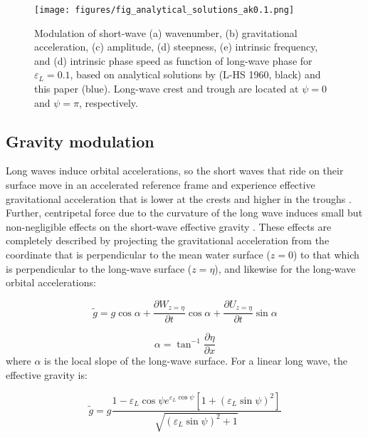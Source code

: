 \documentclass[lineno]{jfm}
\begin{document}
\begin{figure}
\centering
\texttt{[image: figures/fig\_analytical\_solutions\_ak0.1.png]}
\caption{
  Modulation of short-wave (a) wavenumber, (b) gravitational acceleration,
  (c) amplitude, (d) steepness, (e) intrinsic frequency, and (d) intrinsic phase
  speed as function of long-wave phase for $\varepsilon_L = 0.1$, based on
  analytical solutions by \citet{longuet1960changes} (L-HS 1960, black)
  and this paper (blue).
  Long-wave crest and trough are located at $\psi = 0$ and $\psi = \pi$,
  respectively.
}
\label{fig:analytical_solutions_ak0.1}
\end{figure}

\subsection{Gravity modulation}
\label{subsection:gravity_modulation}

Long waves induce orbital accelerations, so the short waves that ride on their
surface move in an accelerated reference frame and experience effective
gravitational acceleration that is lower at the crests and higher in the troughs
\citep{longuet1986eulerian,longuet1987propagation}.
Further, centripetal force due to the curvature of the long wave induces small
but non-negligible effects on the short-wave effective gravity
\citep{phillips1981dispersion,zhang1990evolution}.
These effects are completely described by projecting the gravitational
acceleration from the coordinate that is perpendicular to the mean water surface
($z=0$) to that which is perpendicular to the long-wave surface ($z=\eta$),
and likewise for the long-wave orbital accelerations:

\begin{equation}
\label{eq:gravity_modulation_general}
\widetilde{g}
  = g \cos{\alpha} 
  + \dfrac{\partial W_{z=\eta}}{\partial t} \cos{\alpha}
  + \dfrac{\partial U_{z=\eta}}{\partial t} \sin{\alpha}
\end{equation}

\begin{equation}
\label{eq:local_slope}
\alpha = \tan^{-1}{\dfrac{\partial \eta}{\partial x}}
\end{equation}
where $\alpha$ is the local slope of the long-wave surface.
For a linear long wave, the effective gravity is:

\begin{equation}
\label{eq:gravity_modulation_linear}
\widetilde{g}
  = g 
  \frac{
    1 - \varepsilon_L \cos{\psi} e^{\varepsilon_L \cos{\psi}}
    \left[ 1 + \left(\varepsilon_L \sin{\psi}\right)^2 \right]
  }
  {\sqrt{\left(\varepsilon_L \sin{\psi}\right)^2 + 1}}
\end{equation}
\end{document}
